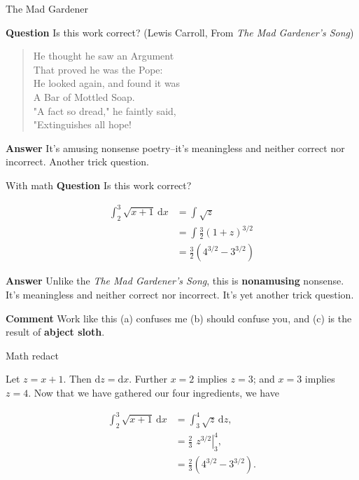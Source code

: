 \documentclass[fleqn]{beamer}
\theoremstyle{definition}
\begin{document}
\begin{frame}{The Mad Gardener}

  \textbf{Question} Is this work correct? 
   (Lewis Carroll, From \emph{The Mad Gardener’s Song})

   \vspace{0.5in}
  \begin{quote}
    He thought he saw an Argument\\
  That proved he was the Pope:\\
  He looked again, and found it was\\
  A Bar of Mottled Soap.\\
  "A fact so dread," he faintly said,\\
  "Extinguishes all hope!  \\
   \end{quote}
 
  \vspace{0.25in}
  \textbf{Answer} It's amusing nonsense poetry--it's meaningless
  and neither correct nor incorrect. Another trick question.
  
\end{frame}

\begin{frame}{With math}
  \textbf{Question} Is this work correct? 

  \begin{align*}
    \int_2^3 \sqrt{x+1} \, \mathrm{d}x &=  \int\sqrt{z}\\
                                       &= \int \frac{3}{2} (1+ z)^{3/2}\\
                                       &=  \frac{3}{2} (4^{3/2} - 3^{3/2})
  \end{align*}

  \textbf{Answer} Unlike the \emph{The Mad Gardener’s Song}, this is 
  \textbf{nonamusing} nonsense. It's 
  meaningless and neither correct nor incorrect. It's yet another 
  trick question.

  \textbf{Comment} Work like this (a) confuses me (b) should 
  confuse you, and (c) is the result of \textbf{abject sloth}.
\end{frame}

\begin{frame}{Math redact}

  Let $z = x+1$. Then $\mathrm{d}z = \mathrm{d}x$. Further
  $x=2$ implies $z=3$; and $x=3$ implies $z=4$. Now that we
  have gathered our four ingredients, we have

\begin{align*}
    \int_2^3 \sqrt{x+1} \, \mathrm{d}x &=  \int_3^4 \sqrt{z} \, \mathrm{d} z,\\
                                       &=  \left. \frac{2}{3} \, \,  z^{3/2} \right |_{3}^4, \\
                                       &= \frac{2}{3} \left(4^{3/2} - 3^{3/2}\right).
  \end{align*}
\end{frame}
\end{document}

